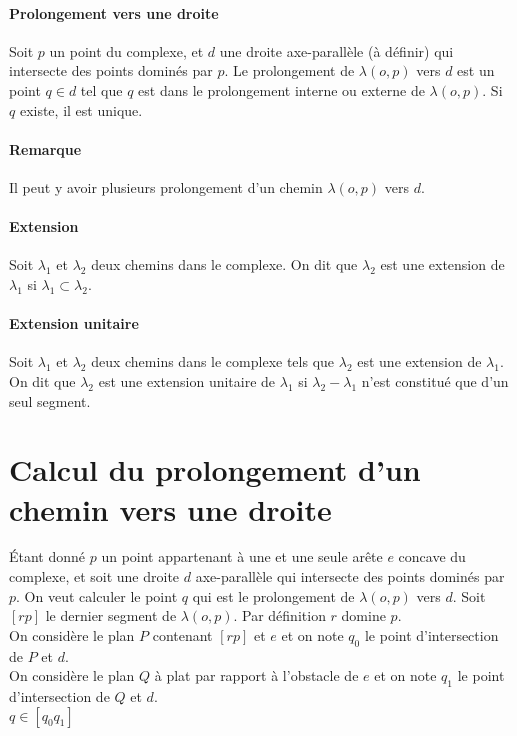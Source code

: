 \documentclass[11pt]{article} %
\begin{document}
\paragraph{Prolongement vers une droite}
Soit $p$ un point du complexe, et $d$ une droite axe-parallèle (à définir) qui intersecte des points dominés par $p$. Le prolongement de $\lambda (o, p)$ vers $d$ est un point $q \in d$ tel que $q$ est dans le prolongement interne ou externe de $\lambda (o, p)$. Si $q$ existe, il est unique.

\paragraph{Remarque} Il peut y avoir plusieurs prolongement d'un chemin $\lambda (o, p)$ vers $d$.

\paragraph{Extension}
Soit $\lambda_1$ et $\lambda_2$ deux chemins dans le complexe. On dit que $\lambda_2$ est une extension de $\lambda_1$ si $\lambda_1 \subset \lambda_2$.

\paragraph{Extension unitaire}
Soit $\lambda_1$ et $\lambda_2$ deux chemins dans le complexe tels que $\lambda_2$ est une extension de $\lambda_1$. On dit que $\lambda_2$ est une extension unitaire de $\lambda_1$ si $\lambda_2 - \lambda_1$ n'est constitué que d'un seul segment.

\section{Calcul du prolongement d'un chemin vers une droite}

\'Etant donné $p$ un point appartenant à une et une seule arête $e$ concave du complexe, et soit une droite $d$ axe-parallèle qui intersecte des points dominés par $p$. On veut calculer le point $q$ qui est le prolongement de $\lambda (o, p)$ vers $d$. Soit $[rp]$ le dernier segment de $\lambda (o, p)$. Par définition $r$ domine $p$. \\

On considère le plan $P$ contenant $[rp]$ et $e$ et on note $q_0$ le point d'intersection de $P$ et $d$. \\
On considère le plan $Q$ à plat par rapport à l'obstacle de $e$ et on note $q_1$ le point d'intersection de $Q$ et $d$. \\
$q \in [q_0 q_1]$
\end{document}
